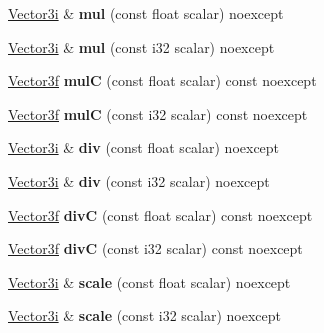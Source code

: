 \begin{DoxyCompactItemize}
\mbox{\hyperlink{class_vector3i}{Vector3i}} \& {\bfseries mul} (const float scalar) noexcept
\item 
\mbox{\label{class_vector3i_a513ab2fea4c1635dad0563c0c69f52a2}} 
\mbox{\hyperlink{class_vector3i}{Vector3i}} \& {\bfseries mul} (const i32 scalar) noexcept
\item 
\mbox{\label{class_vector3i_aefb20bf833fbe1efb6af2852c1b7f134}} 
\mbox{\hyperlink{class_vector3f}{Vector3f}} {\bfseries mulC} (const float scalar) const noexcept
\item 
\mbox{\label{class_vector3i_ae9a5faea7986ed1d485f5d603797d3f6}} 
\mbox{\hyperlink{class_vector3f}{Vector3f}} {\bfseries mulC} (const i32 scalar) const noexcept
\item 
\mbox{\label{class_vector3i_a7d52a3b8781975d2ca4fbdb8f4136d0b}} 
\mbox{\hyperlink{class_vector3i}{Vector3i}} \& {\bfseries div} (const float scalar) noexcept
\item 
\mbox{\label{class_vector3i_af9925dbb0dcf6f2a8cf54694d3d2509e}} 
\mbox{\hyperlink{class_vector3i}{Vector3i}} \& {\bfseries div} (const i32 scalar) noexcept
\item 
\mbox{\label{class_vector3i_ab9261292cddb7df02a1f5e0ff3fb646c}} 
\mbox{\hyperlink{class_vector3f}{Vector3f}} {\bfseries divC} (const float scalar) const noexcept
\item 
\mbox{\label{class_vector3i_aa75a6c99e6f750122a4b7595f995aafe}} 
\mbox{\hyperlink{class_vector3f}{Vector3f}} {\bfseries divC} (const i32 scalar) const noexcept
\item 
\mbox{\label{class_vector3i_ac15d7bf9475c2a1e3511bf078f3c2a93}} 
\mbox{\hyperlink{class_vector3i}{Vector3i}} \& {\bfseries scale} (const float scalar) noexcept
\item 
\mbox{\label{class_vector3i_a399c61147a86cdad0056a30c0fc96881}} 
\mbox{\hyperlink{class_vector3i}{Vector3i}} \& {\bfseries scale} (const i32 scalar) noexcept
\item 
\mbox{\label{class_vector3i_ab82ada2d9554005d09aa03fe8403254e}} 

\end{DoxyCompactItemize}
